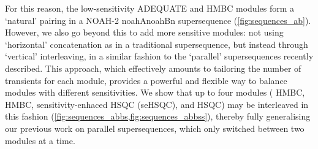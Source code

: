 \documentclass[a4paper,12pt]{article}
\newcommand{\carbon}{\ch{^{13}C}}
\newcommand{\nitrogen}{\ch{^{15}N}}
\newcommand*{\noahtwo}[2]{\csname noah#1\endcsname\csname noah#2\endcsname}
\begin{document}
\begin{refsection}
For this reason, the low-sensitivity ADEQUATE and \nitrogen{} HMBC modules form a `natural' pairing in a NOAH-2 \noahtwo{A}{Bn} supersequence (\cref{fig:sequences_ab}).
However, we also go beyond this to add more sensitive modules: not using `horizontal' concatenation as in a traditional supersequence, but instead through `vertical' interleaving, in a similar fashion to the `parallel' supersequences recently described.\autocite{Kupce2021JACSA}
This approach, which effectively amounts to tailoring the number of transients for each module, provides a powerful and flexible way to balance modules with different sensitivities.
We show that up to four modules (\nitrogen{} HMBC, \carbon{} HMBC, \nitrogen{} sensitivity-enhaced HSQC (seHSQC), and \carbon{} HSQC) may be interleaved in this fashion (\cref{fig:sequences_abbs,fig:sequences_abbss}), thereby fully generalising our previous work on parallel supersequences, which only switched between two modules at a time.


\end{refsection}
\end{document}
